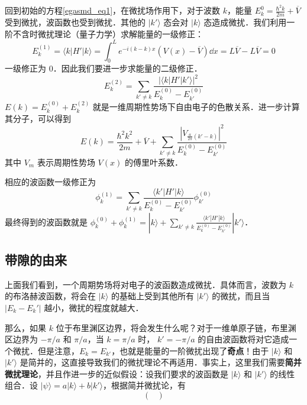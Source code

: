 回到初始的方程\autoref{egasmd_eq1}，在微扰场作用下，对于波数 $k$，能量 $E_k^{0}=\frac{\hbar^2 k}{2m}+\overline V$ 受到微扰，波函数也受到微扰．其他的 $|k'\rangle$ 态会对 $|k\rangle$ 态造成微扰．我们利用一阶不含时微扰理论（量子力学）求解能量的一级修正：
\begin{equation}
E_k^{(1)}=\langle k|H'|k\rangle=\int_0^L e^{-i(k-k)x}(V(x)-\overline V)\dd x=L\overline V-L\overline V=0
\end{equation}
一级修正为 $0$．因此我们要进一步求能量的二级修正．
\begin{equation}
E_k^{(2)}=\sum_{k'\neq k}\frac{|\langle k|H'|k'\rangle|^2}{E_k^{(0)}-E_{k'}^{(0)}}
\end{equation}
$E(k)=E_k^{(0)}+E_k^{(2)}$ 就是一维周期性势场下自由电子的色散关系．进一步计算其分子，可以得到
\begin{equation}
E(k)=\frac{\hbar^2 k^2}{2m}+\overline V+\sum_{k'\neq k} \frac{|V_{\frac{a}{2\pi}(k'-k)}|^2}{E_k^{(0)}-E_{k'}^{(0)}}
\end{equation}
其中 $V_m$ 表示周期性势场 $V(x)$ 的傅里叶系数．

相应的波函数一级修正为
\begin{equation}
\phi_k^{(1)}=\sum_{k'\neq k}\frac{\langle k'|H'|k\rangle}{E_k^{(0)}-E_{k'}^{(0)}} \phi_{k'}^{(0)}
\end{equation}
最终得到的波函数就是 $\phi_k^{(0)}+\phi_k^{(1)}=|k\rangle+\sum_{k'\neq k}\frac{\langle k'|H'|k\rangle}{E_k^{(0)}-E_{k'}^{(0)}} |k'\rangle$．
\subsection{带隙的由来}
上面我们看到，一个周期势场将对电子的波函数造成微扰．具体而言，波数为 $k$ 的布洛赫波函数，将会在 $|k\rangle$ 的基础上受到其他所有 $|k'\rangle$ 的微扰，而且当 $|E_k-E_k'|$ 越小，微扰的程度就越大．

那么，如果 $k$ 位于布里渊区边界，将会发生什么呢？对于一维单原子链，布里渊区边界为 $-\pi/a$ 和 $\pi/a$，当 $k=\pi/a$ 时， $k'=-\pi/a$ 的自由波函数将对它造成一个微扰．但是注意，$E_k=E_{k'}$，也就是能量的一阶微扰出现了\textbf{奇点}！由于 $|k\rangle$ 和 $|k'\rangle$ 是简并的，这直接导致我们的微扰理论不再适用．事实上，这里我们需要\textbf{简并微扰理论}，并且作进一步的近似假设：设我们要求的波函数是 $|k\rangle$ 和 $|k'\rangle$ 的线性组合．设 $|\psi\rangle=a|k\rangle+b|k'\rangle$，根据简并微扰论，有
\begin{equation}
\begin{pmatrix}

\end{pmatrix}
\end{equation}
